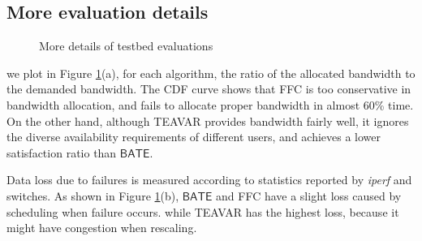 \documentclass[sigconf]{acmart}
\begin{document}
\begin{appendices}
     \section{More evaluation details} \label{testbed-appendix}
     \begin{figure}
\centering
{}
\caption{More details of testbed evaluations}
\label{appendix-e1}
\end{figure}

we plot in Figure \ref{appendix-e1}(a), for each algorithm, the ratio of the allocated bandwidth 
to the demanded bandwidth. 
The CDF curve shows that FFC is too conservative in bandwidth allocation, 
and fails to allocate proper bandwidth in almost 60\% time.   
On the other hand, although TEAVAR provides bandwidth fairly well, 
it ignores the diverse availability requirements of different users, 
and achieves a lower satisfaction ratio than $\mathsf{BATE}$. 


Data loss due to failures is measured according to statistics reported by \textit{iperf} and switches.
As shown in Figure  \ref{appendix-e1}(b),
$\mathsf{BATE}$ and FFC have a slight loss caused by scheduling when failure occurs.
 while TEAVAR has the highest loss, because it might have congestion when rescaling.


\end{appendices}
\end{document}
